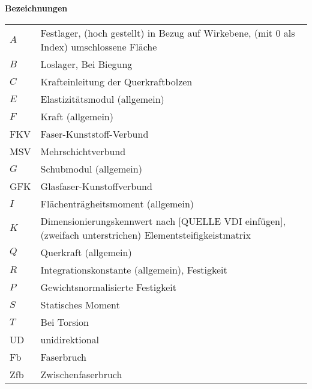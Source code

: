 \textbf{Bezeichnungen}
\begin{table}[h]

\begin{tabular}{ll}
	$ A $&Festlager, (hoch gestellt) in Bezug auf Wirkebene, (mit 0 als Index) umschlossene Fläche\\
	$ B $&Loslager, Bei Biegung\\
	$ C $&Krafteinleitung der Querkraftbolzen\\
	$ E $&Elastizitätsmodul (allgemein)\\
	$ F $&Kraft (allgemein)\\
	FKV&Faser-Kunststoff-Verbund\\
	MSV&Mehrschichtverbund\\
	$ G $&Schubmodul (allgemein)\\
	GFK& Glasfaser-Kunstoffverbund\\
	$ I $&Flächenträgheitsmoment (allgemein)\\
	$ K $&Dimensionierungskennwert nach [QUELLE VDI einfügen], (zweifach unterstrichen) Elementsteifigkeistmatrix\\
	$ Q $&Querkraft (allgemein)\\
	$ R $&Integrationskonstante (allgemein), Festigkeit\\
	$ P $&Gewichtsnormalisierte Festigkeit\\
	$ S $&Statisches Moment\\
	$ T $&Bei Torsion\\
	UD&unidirektional\\
	Fb&Faserbruch\\
	Zfb&Zwischenfaserbruch\\
	
	
\end{tabular}
\end{table}

